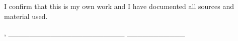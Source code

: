 \thispagestyle{empty}
\vspace*{0.8\textheight}
\noindent
I confirm that this \MakeLowercase{\getDoctype{}} is my own work and I have documented all sources and material used.

\vspace{15mm}
\noindent
\getSubmissionLocation{}, \_\_\_\_\_\_\_\_\_\_\_\_\_\_\_\_\_\_\_\_\_\_ \hfill \getAuthor{} \_\_\_\_\_\_\_\_\_\_\_

\cleardoublepage{}
